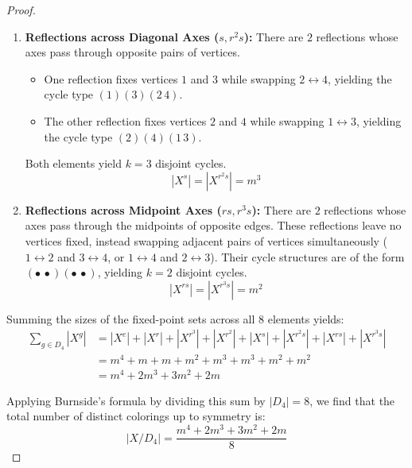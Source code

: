\begin{proof}
\begin{enumerate}
    \item \textbf{Reflections across Diagonal Axes ($s, r^2s$):} 
    There are $2$ reflections whose axes pass through opposite pairs of vertices. 
    \begin{itemize}
        \item One reflection fixes vertices $1$ and $3$ while swapping $2 \leftrightarrow 4$, yielding the cycle type $(1)(3)(2\,4)$.
        \item The other reflection fixes vertices $2$ and $4$ while swapping $1 \leftrightarrow 3$, yielding the cycle type $(2)(4)(1\,3)$.
    \end{itemize}
    Both elements yield $k = 3$ disjoint cycles.
    \[ |X^s| = |X^{r^2s}| = m^3 \]

    \item \textbf{Reflections across Midpoint Axes ($rs, r^3s$):} 
    There are $2$ reflections whose axes pass through the midpoints of opposite edges. These reflections leave no vertices fixed, instead swapping adjacent pairs of vertices simultaneously ($1 \leftrightarrow 2$ and $3 \leftrightarrow 4$, or $1 \leftrightarrow 4$ and $2 \leftrightarrow 3$). Their cycle structures are of the form $(\bullet\,\bullet)(\bullet\,\bullet)$, yielding $k = 2$ disjoint cycles.
    \[ |X^{rs}| = |X^{r^3s}| = m^2 \]
\end{enumerate}

Summing the sizes of the fixed-point sets across all $8$ elements yields:
\begin{align*}
\sum_{g \in D_4} |X^g| &= |X^e| + |X^r| + |X^{r^3}| + |X^{r^2}| + |X^s| + |X^{r^2s}| + |X^{rs}| + |X^{r^3s}| \\
&= m^4 + m + m + m^2 + m^3 + m^3 + m^2 + m^2 \\
&= m^4 + 2m^3 + 3m^2 + 2m
\end{align*}

Applying Burnside's formula by dividing this sum by $|D_4| = 8$, we find that the total number of distinct colorings up to symmetry is:
\[
|X/D_4| = \frac{m^4 + 2m^3 + 3m^2 + 2m}{8}
\]
\end{proof}

